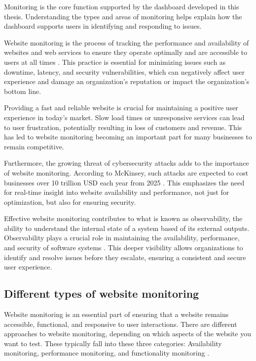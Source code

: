 Monitoring is the core function supported by the dashboard developed in this thesis. Understanding the types and areas of monitoring helps explain how the dashboard supports users in identifying and responding to issues.

Website monitoring is the process of tracking the performance and availability of websites and web services to ensure they operate optimally and are accessible to users at all times \autocite{IBMwebmonitor}. This practice is essential for minimizing issues such as downtime, latency, and security vulnerabilities, which can negatively affect user experience and damage an organization’s reputation or impact the organization’s bottom line.

Providing a fast and reliable website is crucial for maintaining a positive user experience in today's market. Slow load times or unresponsive services can lead to user frustration, potentially resulting in loss of customers and revenue. This has led to website monitoring becoming an important part for many businesses to remain competitive.

Furthermore, the growing threat of cybersecurity attacks adds to the importance of website monitoring. According to McKinsey, such attacks are expected to cost businesses over 10 trillion USD each year from 2025 \autocite{McKinsey}. This emphasizes the need for real-time insight into website availability and performance, not just for optimization, but also for ensuring security.

Effective website monitoring contributes to what is known as observability, the ability to understand the internal state of a system based of its external outputs. Observability plays a crucial role in maintaining the availability, performance, and security of software systems \autocite{IBMobservability}. This deeper visibility allows organizations to identify and resolve issues before they escalate, ensuring a consistent and secure user experience.

\subsection{Different types of website monitoring}
\label{subsec:monitoring_types}


Website monitoring is an essential part of ensuring that a website remains accessible, functional, and responsive to user interactions. There are different approaches to website monitoring, depending on which aspects of the website you want to test. These typically fall into these three categories: Availability monitoring, performance monitoring, and functionality monitoring \autocite{Uptrendsmonitoring}.

